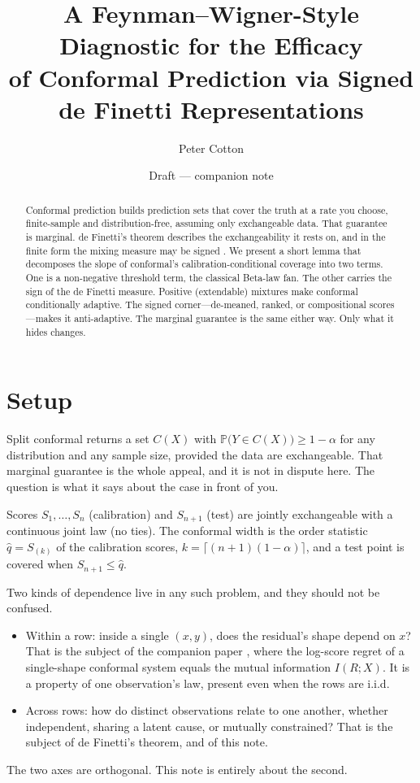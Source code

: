 \documentclass[11pt]{article}
\title{A Feynman--Wigner-Style Diagnostic for the Efficacy\\
of Conformal Prediction via Signed de Finetti Representations}
\author{Peter Cotton}
\date{Draft --- companion note}
\begin{document}
\maketitle

\begin{abstract}
Conformal prediction builds prediction sets that cover the truth at a rate you choose,
finite-sample and distribution-free, assuming only exchangeable data. That
guarantee is marginal. de Finetti's theorem describes the exchangeability it rests on, and in
the finite form the mixing measure may be signed \citep{kerns2006}. We present a short lemma that decomposes the
slope of conformal's calibration-conditional coverage into two terms. One is a non-negative
threshold term, the classical Beta-law fan. The other carries the sign of the de Finetti
measure. Positive (extendable) mixtures make conformal conditionally adaptive. The signed
corner---de-meaned, ranked, or compositional scores---makes it anti-adaptive. The marginal
guarantee is the same either way. Only what it hides changes.
\end{abstract}

\section{Setup}

Split conformal returns a set $C(X)$ with $\mathbb P\big(Y\in C(X)\big)\ge 1-\alpha$ for any
distribution and any sample size, provided the data are exchangeable. That marginal guarantee
is the whole appeal, and it is not in dispute here. The question is what it says about the case
in front of you.

Scores $S_1,\dots,S_n$ (calibration) and $S_{n+1}$ (test) are jointly
exchangeable with a continuous joint law (no ties). The conformal width is the order
statistic $\hat q = S_{(k)}$ of the calibration scores, $k=\lceil(n+1)(1-\alpha)\rceil$, and a
test point is covered when $S_{n+1}\le\hat q$.

Two kinds of dependence live in any such problem, and they should not be confused.
\begin{itemize}
\item Within a row: inside a single $(x,y)$, does the residual's shape depend on $x$? That is
the subject of the companion paper \citep{cotton_marginally}, where the log-score regret of a
single-shape conformal system equals the mutual information $I(R;X)$. It is a property of one
observation's law, present even when the rows are i.i.d.
\item Across rows: how do distinct observations relate to one another, whether independent,
sharing a latent cause, or mutually constrained? That is the subject of de Finetti's theorem,
and of this note.
\end{itemize}
The two axes are orthogonal. This note is entirely about the second.
\end{document}
